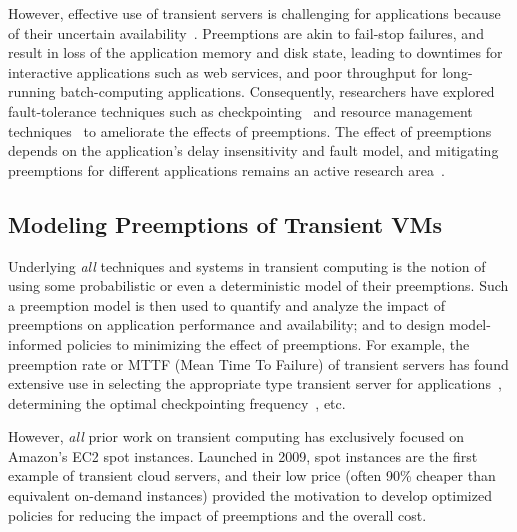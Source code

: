 
However, effective use of transient servers is challenging for applications because of their uncertain availability~\cite{transient}. 
Preemptions are akin to fail-stop failures, and result in loss of the application memory and disk state, leading to downtimes for interactive applications such as web services, and poor throughput for long-running batch-computing applications. 
Consequently, researchers have explored fault-tolerance techniques such as checkpointing~\cite{flint, marathe2014exploiting, spoton} and resource management techniques~\cite{exosphere} to ameliorate the effects of preemptions. %
The effect of preemptions depends on the application's delay insensitivity and fault model, and mitigating preemptions for different applications remains an active research area~\cite{hourglass-eurosys19}. 




\subsection{Modeling Preemptions of Transient VMs}


Underlying \emph{all} techniques and systems in transient computing is the notion of using some probabilistic or even a deterministic model of their preemptions.
Such a preemption model is then used to quantify and analyze the impact of preemptions on application performance and availability; and to design model-informed policies to minimizing the effect of preemptions.
%
For example, the preemption rate or MTTF (Mean Time To Failure) of transient servers has found extensive use in selecting the appropriate type transient server for applications~\cite{exosphere, spoton}, determining the optimal checkpointing frequency~\cite{flint, marathe2014exploiting, proteus-eur17, ghit-spark-hpdc}, etc.

However, \emph{all} prior work on transient computing has exclusively focused on Amazon's EC2 spot instances.
Launched in 2009, spot instances are the first example of transient cloud servers, and their low price (often 90\% cheaper than equivalent on-demand instances) provided the motivation to develop optimized policies for reducing the impact of preemptions and the overall cost. 


